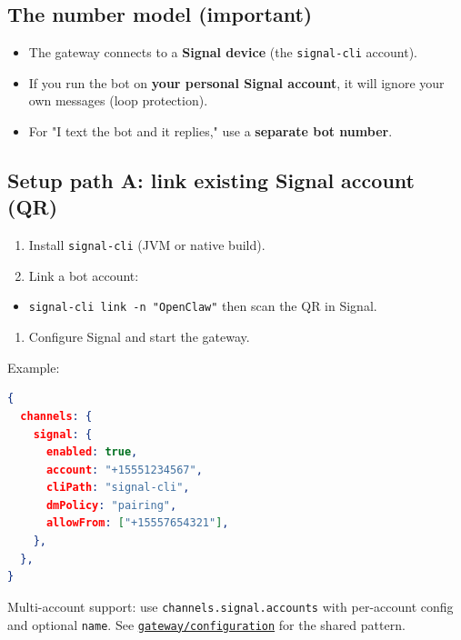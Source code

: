 \subsection{The number model (important)}


\begin{itemize}
  \item The gateway connects to a \textbf{Signal device} (the \texttt{signal-cli} account).
  \item If you run the bot on \textbf{your personal Signal account}, it will ignore your own messages (loop protection).
  \item For "I text the bot and it replies," use a \textbf{separate bot number}.
\end{itemize}


\subsection{Setup path A: link existing Signal account (QR)}


\begin{enumerate}
  \item Install \texttt{signal-cli} (JVM or native build).
  \item Link a bot account:
\end{enumerate}

\begin{itemize}
  \item \texttt{signal-cli link -n "OpenClaw"} then scan the QR in Signal.
\end{itemize}

\begin{enumerate}
  \item Configure Signal and start the gateway.
\end{enumerate}


Example:

\begin{lstlisting}[language=json]
{
  channels: {
    signal: {
      enabled: true,
      account: "+15551234567",
      cliPath: "signal-cli",
      dmPolicy: "pairing",
      allowFrom: ["+15557654321"],
    },
  },
}
\end{lstlisting}


Multi-account support: use \texttt{channels.signal.accounts} with per-account config and optional \texttt{name}. See \href{/gateway/configuration\#telegramaccounts--discordaccounts--slackaccounts--signalaccounts--imessageaccounts}{\texttt{gateway/configuration}} for the shared pattern.

